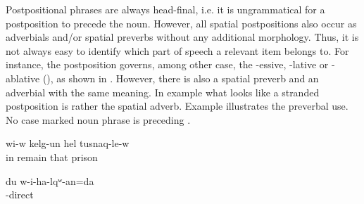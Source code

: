 Postpositional phrases are always head-final, i.e. it is ungrammatical for a postposition to precede the noun. However, all spatial postpositions also occur as adverbials and/or spatial preverbs without any additional morphology. Thus, it is not always easy to identify which part of speech a relevant item belongs to. For instance, the postposition   governs, among other case, the -essive, -lative or -ablative (), as shown in . However, there is also a spatial preverb  and an adverbial  with the same meaning. In example  what looks like a stranded postposition  is rather the spatial adverb. Example  illustrates the preverbal use. No case marked noun phrase is preceding .
%
\begin{exe}
	\ex	\label{ex:He stayed in prison}
	\gll	wi-w kelg-un	hel	tusnaq-le-w\\
		in remain	that	prison\\
	\glt	{}

	\ex	\label{ex:I will go inside}
	\gll	du	w-i-ha-lqʷ-an=da\\
			-direct\\
	\glt	{}
\end{exe}


